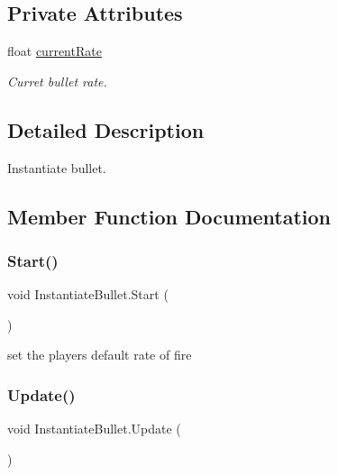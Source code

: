\subsection*{Private Attributes}
\begin{DoxyCompactItemize}
\item 
float \mbox{\hyperlink{class_instantiate_bullet_a6616ff47defe7c35d2ce6bea1b9e871a}{current\+Rate}}
\begin{DoxyCompactList}\small\item\em Curret bullet rate. \end{DoxyCompactList}\end{DoxyCompactItemize}


\subsection{Detailed Description}
Instantiate bullet. 



\subsection{Member Function Documentation}
\mbox{\label{class_instantiate_bullet_aedc5efe186e3d0ad9639c58be67088ac}} 
\subsubsection{\texorpdfstring{Start()}{Start()}}
{\footnotesize\ttfamily void Instantiate\+Bullet.\+Start (\begin{DoxyParamCaption}{ }\end{DoxyParamCaption})\hspace{0.3cm}{\ttfamily [private]}}



set the player\textquotesingle{}s default rate of fire 

\mbox{\label{class_instantiate_bullet_a0a6f4639d59779ad8d5ef7de4ef5234c}} 
\subsubsection{\texorpdfstring{Update()}{Update()}}
{\footnotesize\ttfamily void Instantiate\+Bullet.\+Update (\begin{DoxyParamCaption}{ }\end{DoxyParamCaption})\hspace{0.3cm}{\ttfamily [private]}}



